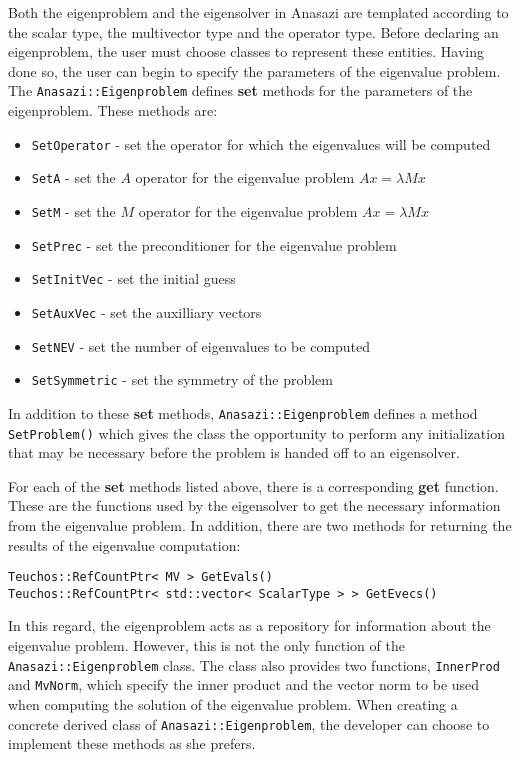 Both the eigenproblem and the eigensolver in Anasazi are templated according
to the scalar type, the multivector type and the operator type. Before
declaring an eigenproblem, the user must choose classes to represent these
entities. Having done so, the user can begin to specify the parameters of the
eigenvalue problem. The \verb!Anasazi::Eigenproblem! defines \textbf{set} methods for
the parameters of the eigenproblem. These methods are:
\begin{itemize}
\item \verb!SetOperator! - set the operator for which the eigenvalues will be computed
\item \verb!SetA! - set the $A$ operator for the eigenvalue problem $Ax=\lambda M x$
\item \verb!SetM! - set the $M$ operator for the eigenvalue problem $Ax=\lambda M x$
\item \verb!SetPrec! - set the preconditioner for the eigenvalue problem
\item \verb!SetInitVec! - set the initial guess
\item \verb!SetAuxVec! - set the auxilliary vectors
\item \verb!SetNEV! - set the number of eigenvalues to be computed
\item \verb!SetSymmetric! - set the symmetry of the problem
\end{itemize}
In addition to these \textbf{set} methods, \verb!Anasazi::Eigenproblem! defines
a method \verb!SetProblem()! which gives the class the opportunity to perform any
initialization that may be necessary before the problem is handed off to an
eigensolver.

For each of the \textbf{set} methods listed above, there is a corresponding
\textbf{get} function. These are the functions used by the eigensolver to get
the necessary information from the eigenvalue problem. In addition, there are
two methods for returning the results of the eigenvalue computation:
\begin{verbatim}
Teuchos::RefCountPtr< MV > GetEvals()
Teuchos::RefCountPtr< std::vector< ScalarType > > GetEvecs()
\end{verbatim}

In this regard, the eigenproblem acts as a repository for information about the
eigenvalue problem. However, this is not the only function of the
\verb!Anasazi::Eigenproblem! class. The class also provides two functions,
\verb!InnerProd! and \verb!MvNorm!, which specify the inner product and the
vector norm to be used when computing the solution of the eigenvalue problem.
When creating a concrete derived class of \verb!Anasazi::Eigenproblem!, the
developer can choose to implement these methods as she prefers.


